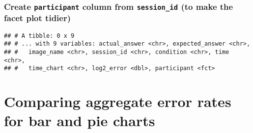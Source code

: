 \documentclass[]{article}
\newenvironment{Shaded}{\begin{snugshade}}{\end{snugshade}}
\newcommand{\KeywordTok}[1]{\textcolor[rgb]{0.13,0.29,0.53}{\textbf{{#1}}}}
\newcommand{\DataTypeTok}[1]{\textcolor[rgb]{0.13,0.29,0.53}{{#1}}}
\newcommand{\DecValTok}[1]{\textcolor[rgb]{0.00,0.00,0.81}{{#1}}}
\newcommand{\FloatTok}[1]{\textcolor[rgb]{0.00,0.00,0.81}{{#1}}}
\newcommand{\StringTok}[1]{\textcolor[rgb]{0.31,0.60,0.02}{{#1}}}
\newcommand{\NormalTok}[1]{{#1}}
\begin{document}
\begin{Shaded}
\end{Shaded}

\subsubsection{\texorpdfstring{Create \texttt{participant} column from
\texttt{session\_id} (to make the facet plot
tidier)}{Create participant column from session\_id (to make the facet plot tidier)}}\label{create-participant-column-from-session_id-to-make-the-facet-plot-tidier}

\begin{Shaded}
\end{Shaded}

\begin{verbatim}
## # A tibble: 0 x 9
## # ... with 9 variables: actual_answer <chr>, expected_answer <chr>,
## #   image_name <chr>, session_id <chr>, condition <chr>, time <chr>,
## #   time_chart <chr>, log2_error <dbl>, participant <fct>
\end{verbatim}

\section{Comparing aggregate error rates for bar and pie
charts}\label{comparing-aggregate-error-rates-for-bar-and-pie-charts}
\end{document}
